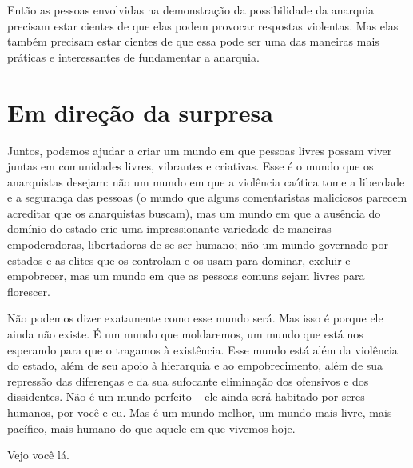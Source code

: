 Então as pessoas envolvidas na demonstração da possibilidade da anarquia precisam estar cientes de que elas podem provocar respostas violentas. Mas elas também precisam estar cientes de que essa pode ser uma das maneiras mais práticas e interessantes de fundamentar a anarquia.

\section{Em direção da surpresa}

Juntos, podemos ajudar a criar um mundo em que pessoas livres possam viver juntas em comunidades livres, vibrantes e criativas. Esse é o mundo que os anarquistas desejam: não um mundo em que a violência caótica tome a liberdade e a segurança das pessoas (o mundo que alguns comentaristas maliciosos parecem acreditar que os anarquistas buscam), mas um mundo em que a ausência do domínio do estado crie uma impressionante variedade de maneiras empoderadoras, libertadoras de se ser humano; não um mundo governado por estados e as elites que os controlam e os usam para dominar, excluir e empobrecer, mas um mundo em que as pessoas comuns sejam livres para florescer.

Não podemos dizer exatamente como esse mundo será. Mas isso é porque ele ainda não existe. É um mundo que moldaremos, um mundo que está nos esperando para que o tragamos à existência. Esse mundo está além da violência do estado, além de seu apoio à hierarquia e ao empobrecimento, além de sua repressão das diferenças e da sua sufocante eliminação dos ofensivos e dos dissidentes. Não é um mundo perfeito -- ele ainda será habitado por seres humanos, por você e eu. Mas é um mundo melhor, um mundo mais livre, mais pacífico, mais humano do que aquele em que vivemos hoje.

Vejo você lá.